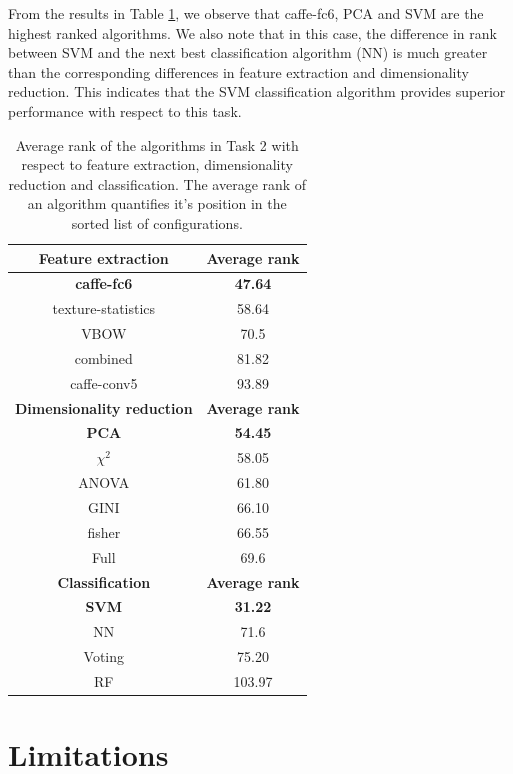 From the results in Table \ref{table:average_rank2}, we observe that caffe-fc6, PCA and SVM are the highest ranked algorithms. We also note that in this case, the difference in rank between SVM and the next best classification algorithm (NN) is much greater than the corresponding differences in feature extraction and dimensionality reduction. This indicates that the SVM classification algorithm provides superior performance with respect to this task.

\begin{table}[ht!]
\centering
\caption{Average rank of the algorithms in Task 2 with respect to feature extraction, dimensionality reduction and classification. The average rank of an algorithm quantifies it's position in the sorted list of configurations.}
\begin{tabular}{ |c|c| } 
 \hline
 \textbf{Feature extraction} & \textbf{Average rank} \\ 
 \hline
 \textbf{caffe-fc6} & \textbf{47.64}\\
 \hline
texture-statistics & 58.64\\
 \hline
VBOW & 70.5 \\
 \hline
combined & 81.82\\
 \hline
caffe-conv5 & 93.89\\
 \hline
 \hline
 \textbf{Dimensionality reduction} & \textbf{Average rank} \\ 
 \hline
 \textbf{PCA} & \textbf{54.45}\\
 \hline
$\chi^2$ & 58.05\\
\hline
ANOVA & 61.80\\
 \hline
GINI & 66.10\\
 \hline
 fisher & 66.55\\ 
 \hline
Full & 69.6 \\
 \hline
 \hline
 \textbf{Classification} & \textbf{Average rank} \\ 
 \hline
\textbf{SVM} & \textbf{31.22}\\
 \hline
NN & 71.6\\
 \hline
Voting & 75.20 \\
 \hline
RF & 103.97\\
 \hline
 \end{tabular}
\label{table:average_rank2}
\end{table}


\section{Limitations}
\label{limitations}

